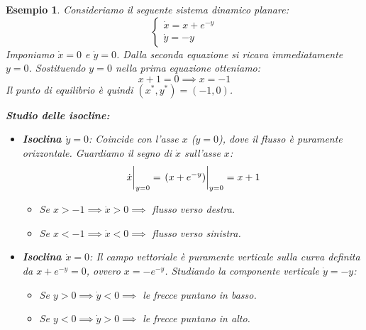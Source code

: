 \documentclass[openany]{book}
\newtheorem*{esempio}{Esempio}
\theoremstyle{definition}
\theoremstyle{remark}
\begin{document}
\begin{esempio}
Consideriamo il seguente sistema dinamico planare:
\begin{equation*}
    \begin{cases}
        \dot{x} = x + e^{-y} \\
        \dot{y} = -y
    \end{cases}
\end{equation*}
Imponiamo $\dot{x} = 0$ e $\dot{y} = 0$. Dalla seconda equazione si ricava immediatamente $y = 0$. Sostituendo $y=0$ nella prima equazione otteniamo:
$$ x + 1 = 0 \implies x = -1 $$
Il punto di equilibrio è quindi $(x^*, y^*) = (-1, 0)$.

\vspace{0.3cm}
\textbf{Studio delle isocline:}
\begin{itemize}
    \item \textbf{Isoclina $\dot{y} = 0$}: Coincide con l'asse $x$ ($y=0$), dove il flusso è puramente orizzontale. Guardiamo il segno di $\dot{x}$ sull'asse $x$:
    $$ \eval{\dot{x}}_{y=0} = \eval{(x + e^{-y})}_{y=0} = x + 1 $$
    \begin{itemize}
        \item Se $x > -1 \implies \dot{x} > 0 \implies$ flusso verso destra.
        \item Se $x < -1 \implies \dot{x} < 0 \implies$ flusso verso sinistra.
    \end{itemize}
\end{itemize}

\begin{center}
\end{center}

\begin{itemize}
    \item \textbf{Isoclina $\dot{x} = 0$}: Il campo vettoriale è puramente verticale sulla curva definita da $x + e^{-y} = 0$, ovvero $x = -e^{-y}$.
    Studiando la componente verticale $\dot{y} = -y$:
    \begin{itemize}
        \item Se $y > 0 \implies \dot{y} < 0 \implies$ le frecce puntano in basso.
        \item Se $y < 0 \implies \dot{y} > 0 \implies$ le frecce puntano in alto.
    \end{itemize}
\end{itemize}


\end{esempio}
\end{document}

